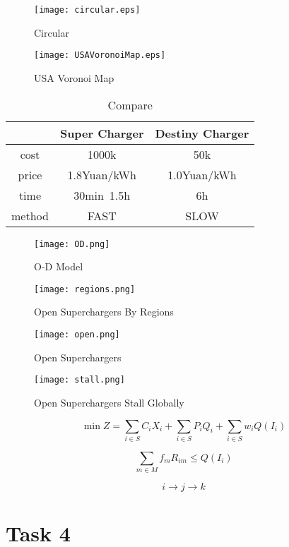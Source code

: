 \documentclass{mcmthesis}
\begin{document}
\begin{figure}[htbp]
\small
\centering
\texttt{[image: circular.eps]}
\caption{Circular} 
\end{figure}

\begin{figure}[htbp]
\small
\centering
\texttt{[image: USAVoronoiMap.eps]}
\caption{USA Voronoi Map} 
\end{figure}



\begin{table}[!htbp]
\centering
\begin{tabular}{|c|c|c|}
\hline
 &Super Charger&Destiny Charger \\
\hline
cost&1000k&50k\\
\hline
price& 1.8Yuan/kWh& 1.0Yuan/kWh\\
\hline
time& 30min~1.5h& 6h\\
\hline
method&FAST &SLOW \\
\hline
\end{tabular}
\caption{Compare}
\end{table}

\begin{figure}[htbp]
\small
\centering
\texttt{[image: OD.png]}
\caption{O-D Model} 
\end{figure}


\begin{figure}[htbp]
\small
\centering
\texttt{[image: regions.png]}
\caption{Open Superchargers By Regions} 
\end{figure}


\begin{figure}[htbp]
\small
\centering
\texttt{[image: open.png]}
\caption{Open Superchargers} 
\end{figure}


\begin{figure}[htbp]
\small
\centering
\texttt{[image: stall.png]}
\caption{Open Superchargers Stall Globally} 
\end{figure}

\[
\min Z=\sum _{i\in S}C_{i}X_{i} + \sum _{i\in S}P_{i}Q_{i} + \sum _{i\in S}w_{i}Q\left( I_{i}\right)
\]

\[	
\sum _{m\in M}f_{m}R_{im} \leq Q\left( I_{i}\right)
\]

\[
i\rightarrow j\rightarrow k
\]

\section{Task 4}
\end{document}
